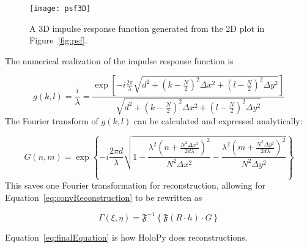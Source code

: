     \begin{figure}[htbp!]
        \begin{center}
            \texttt{[image: psf3D]}
        \end{center}
        \caption{A 3D impulse response function generated from the 2D plot in
            Figure~\ref{fig:psf}.}
            \label{fig:psf3D}
        \end{figure}

    The numerical realization of the impulse response function is

    \begin{equation}
        g(k,l)=\frac{i}{\lambda}=\frac{\exp\left[
        -i\frac{2\pi}{\lambda}\sqrt{d^2+\left(k-\frac{N}{2}\right)^2\Delta x^2+\left(
        l-\frac{N}{2}
    \right)^{2}\Delta y^2} \right]}{\sqrt{d^2+\left(k-\frac{N}{2}\right)^2\Delta x^2+\left(
        l-\frac{N}{2}
    \right)^{2}\Delta y^2}}
    \end{equation}
    The Fourier transform of $g(k,l)$ can be calculated and expressed
    analytically:

    \begin{equation}
        G(n,m) = \exp\left\{ -i\frac{2\pi
        d}{\lambda}\sqrt{1-\frac{\lambda^{2}\left( n+\frac{N^2\Delta
        x^2}{2d\lambda} \right)^2}{N^2\Delta x^2}-\frac{\lambda^{2}\left( m+\frac{N^2\Delta
        y^2}{2d\lambda} \right)^2}{N^2\Delta y^2}} \right\}
    \end{equation}
    This saves one Fourier transformation for reconstruction, allowing for
    Equation~\ref{eq:convReconstruction} to be rewritten as

    \begin{equation}
        \Gamma(\xi,\eta) = \mathfrak{F}^{-1}\left\{ \mathfrak{F}(R\cdot h)
        \cdot G \right\}
        \label{eq:finalEquation}
    \end{equation}

    Equation~\ref{eq:finalEquation} is how HoloPy does reconstructions.










 
